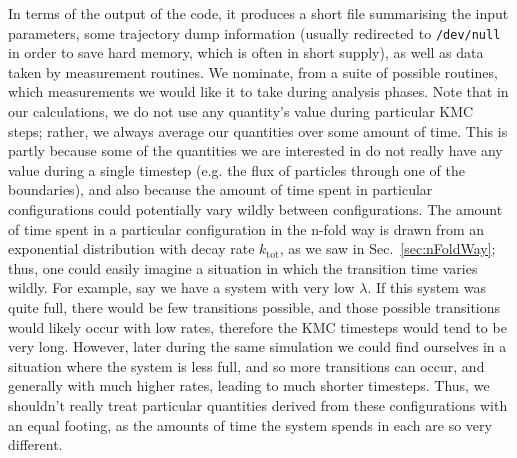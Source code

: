 In terms of the output of the code, it produces a short file summarising the input parameters,
some trajectory dump information (usually redirected to \texttt{/dev/null} in order to save hard
memory, which is often in short supply), as well as data taken by measurement routines. We nominate,
from a suite of possible routines, which measurements we would like it to take during analysis phases.
Note that in our calculations, we do not use any quantity's value during particular KMC steps;
rather, we always average our quantities over some amount of time. This is partly because some of the
quantities we are interested in do not really have any value during a single timestep (e.g. the flux of
particles through one of the boundaries), and also because the amount of time spent in particular
configurations could potentially vary wildly between configurations. The amount of time spent in a
particular configuration in the n-fold way is drawn from an exponential distribution with decay rate
$k_{\mathrm{tot}}$, as we saw in Sec.~\ref{sec:nFoldWay}; thus, one could easily imagine a
situation in which the transition time varies wildly. For example, say we have a system with very low 
$\lambda$. If this system was quite full, there would be few transitions possible, and those possible
transitions would likely occur with low rates, therefore the KMC timesteps would tend to be very long.
However, later during the same simulation we could find ourselves in a situation where the system is
less full, and so more transitions can occur, and generally with much higher rates, leading to much
shorter timesteps. Thus, we shouldn't really treat particular quantities derived from these 
configurations with an equal footing, as the amounts of time the system spends in each are so very 
different.

